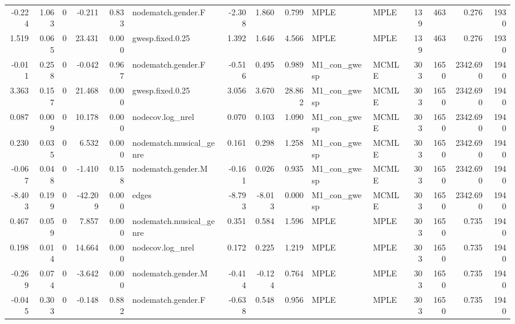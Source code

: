 \begin{table}
\begin{tabular}{rrrrrlrrrllrrrr}
   -0.224 & 1.063 &        0 &   -0.211 &     0.833 &      nodematch.gender.F &  -2.308 &   1.860 &  0.799 &         MPLE &   MPLE &     139 &      463 &     0.276 &      1930 \\
    1.519 & 0.065 &        0 &   23.431 &     0.000 &        gwesp.fixed.0.25 &   1.392 &   1.646 &  4.566 &         MPLE &   MPLE &     139 &      463 &     0.276 &      1930 \\
   -0.011 & 0.258 &        0 &   -0.042 &     0.967 &      nodematch.gender.F &  -0.516 &   0.495 &  0.989 & M1\_con\_gwesp &  MCMLE &     303 &     1650 &  2342.690 &      1940 \\
    3.363 & 0.157 &        0 &   21.468 &     0.000 &        gwesp.fixed.0.25 &   3.056 &   3.670 & 28.862 & M1\_con\_gwesp &  MCMLE &     303 &     1650 &  2342.690 &      1940 \\
    0.087 & 0.009 &        0 &   10.178 &     0.000 &        nodecov.log\_nrel &   0.070 &   0.103 &  1.090 & M1\_con\_gwesp &  MCMLE &     303 &     1650 &  2342.690 &      1940 \\
    0.230 & 0.035 &        0 &    6.532 &     0.000 & nodematch.musical\_genre &   0.161 &   0.298 &  1.258 & M1\_con\_gwesp &  MCMLE &     303 &     1650 &  2342.690 &      1940 \\
   -0.067 & 0.048 &        0 &   -1.410 &     0.158 &      nodematch.gender.M &  -0.161 &   0.026 &  0.935 & M1\_con\_gwesp &  MCMLE &     303 &     1650 &  2342.690 &      1940 \\
   -8.403 & 0.199 &        0 &  -42.209 &     0.000 &                   edges &  -8.793 &  -8.013 &  0.000 & M1\_con\_gwesp &  MCMLE &     303 &     1650 &  2342.690 &      1940 \\
    0.467 & 0.059 &        0 &    7.857 &     0.000 & nodematch.musical\_genre &   0.351 &   0.584 &  1.596 &         MPLE &   MPLE &     303 &     1650 &     0.735 &      1940 \\
    0.198 & 0.014 &        0 &   14.664 &     0.000 &        nodecov.log\_nrel &   0.172 &   0.225 &  1.219 &         MPLE &   MPLE &     303 &     1650 &     0.735 &      1940 \\
   -0.269 & 0.074 &        0 &   -3.642 &     0.000 &      nodematch.gender.M &  -0.414 &  -0.124 &  0.764 &         MPLE &   MPLE &     303 &     1650 &     0.735 &      1940 \\
   -0.045 & 0.303 &        0 &   -0.148 &     0.882 &      nodematch.gender.F &  -0.638 &   0.548 &  0.956 &         MPLE &   MPLE &     303 &     1650 &     0.735 &      1940 \\

\end{tabular}
\end{table}

